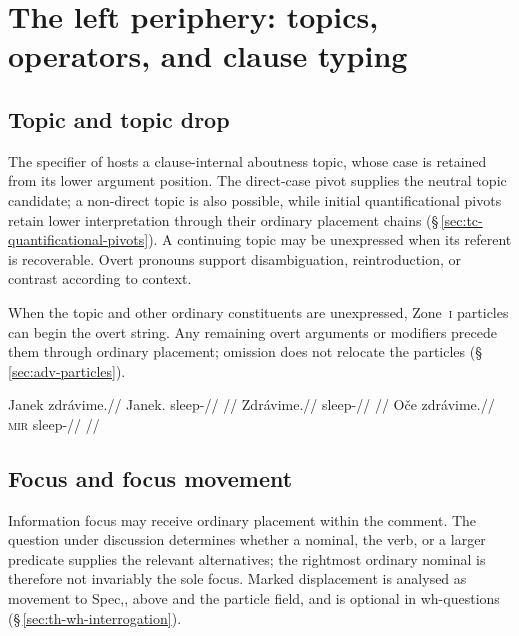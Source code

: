 \section{The left periphery: topics, operators, and clause typing}
\label{sec:th-left-periphery}

\subsection{Topic and topic drop}
\label{sec:th-topic}

The specifier of  hosts a clause-internal aboutness topic,
 whose case is retained from its lower argument position. The direct-case
 pivot supplies the neutral topic candidate; a non-direct topic is also
 possible, while initial quantificational pivots retain lower interpretation
 through their ordinary placement chains
 (§\,\ref{sec:tc-quantificational-pivots}). A continuing topic may be
 unexpressed when its referent is recoverable. Overt pronouns support
 disambiguation, reintroduction, or contrast according to context.

When the topic and other ordinary constituents are unexpressed,
Zone~\textsc{i} particles can begin the overt string. Any remaining overt
arguments or modifiers precede them through ordinary placement; omission
does not relocate the particles
(§\,\ref{sec:adv-particles}).

\pex
\a
\begingl
\gla Janek zdrávime.//
\glb Janek.\Dir{} sleep-\Prog{}//
\glft {} //
\endgl
\a
\begingl
\gla Zdrávime.//
\glb sleep-\Prog{}//
\glft {} //
\endgl
\a
\begingl
\gla Oče zdrávime.//
\glb \textsc{mir} sleep-\Prog{}//
\glft {} //
\endgl
\xe

\subsection{Focus and focus movement}
\label{sec:th-focus}

Information focus may receive ordinary placement within the comment. The question under
 discussion determines whether a nominal, the verb, or a larger predicate
 supplies the relevant alternatives; the rightmost ordinary nominal is
 therefore not invariably the sole focus. Marked displacement is analysed as
 movement to Spec,, above  and the particle field, and is
 optional in wh-questions (§\,\ref{sec:th-wh-interrogation}).

